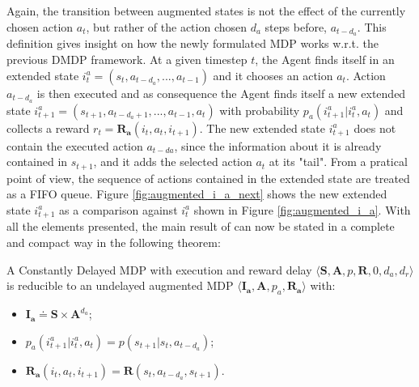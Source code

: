                 Again, the transition between augmented states is not the effect of the currently chosen action $a_t$, but rather of the action chosen $d_{a}$ steps before, $a_{t-d_{a}}$. This definition gives insight on how the newly formulated MDP works w.r.t. the previous DMDP framework. At a given timestep $t$, the Agent finds itself in an extended state $i_t^{a} = \left( s_t, a_{t-d_{a}}, ..., a_{t-1} \right)$ and it chooses an action $a_t$. Action $a_{t-d_{a}}$ is then executed and as consequence  the Agent finds itself a new extended state $i_{t+1}^{a} = \left( s_{t+1}, a_{t-d_{a}+1}, ..., a_{t-1}, a_{t} \right)$ with probability $p_a \left( i_{t+1}^a | i_t^a , a_t  \right)$ and collects a reward $r_t = \mathbf{R_{a}}\left( i_t, a_{t}, i_{t+1} \right)$. The new extended state $i_{t+1}^{a}$ does not contain the executed action $a_{t-d{a}}$, since the information about it is already contained in $s_{t+1}$, and it adds the selected action $a_t$ at its "tail". From a pratical point of view, the sequence of actions contained in the extended state are treated as a FIFO queue. Figure \ref{fig:augmented_i_a_next} shows the new extended state $i_{t+1}^{a}$ as a comparison against $i_t^{a}$ shown in Figure \ref{fig:augmented_i_a}.
                With all the elements presented, the main result of  can now be stated in a complete and compact way in the following theorem:
            
                \begin{theorem}
                    \label{th:dmdpexecred}
                    A Constantly Delayed MDP with execution and reward delay $\langle \mathbf{S}, \mathbf{A}, p, \mathbf{R}, 0, d_a, d_r \rangle$ is reducible to an undelayed augmented MDP $\langle \mathbf{I_a}, \mathbf{A}, p_a, \mathbf{R_a} \rangle$ with: 
                    \begin{itemize}[topsep=0.5em, partopsep=0.5em]
                        \setlength\itemsep{0em}
                        \item $\mathbf{I_{a}} \doteq \mathbf{S} \times \mathbf{A}^{d_a}$;
                        \item $p_a \left( i_{t+1}^a | i_t^a , a_t  \right) = p \left( s_{t+1} | s_t, a_{t-d_{a}} \right)$;
                        \item $\mathbf{R_{a}}\left( i_t, a_{t}, i_{t+1} \right) = \mathbf{R} \left( s_t, a_{t-d_{a}}, s_{t+1} \right)$.
                    \end{itemize}
                \end{theorem}
                
